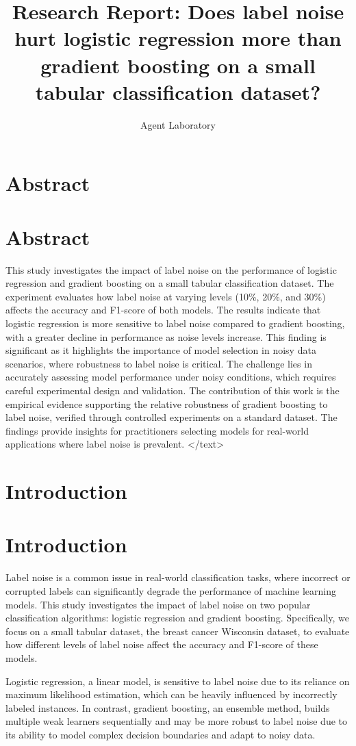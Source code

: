 \documentclass{article}
\title{Research Report: Does label noise hurt logistic regression more than gradient boosting on a small tabular classification dataset?}
\author{Agent Laboratory}
\begin{document}
\maketitle
\section{Abstract}
\section*{Abstract}
This study investigates the impact of label noise on the performance of logistic regression and gradient boosting on a small tabular classification dataset. The experiment evaluates how label noise at varying levels (10\%, 20\%, and 30\%) affects the accuracy and F1-score of both models. The results indicate that logistic regression is more sensitive to label noise compared to gradient boosting, with a greater decline in performance as noise levels increase. This finding is significant as it highlights the importance of model selection in noisy data scenarios, where robustness to label noise is critical. The challenge lies in accurately assessing model performance under noisy conditions, which requires careful experimental design and validation. The contribution of this work is the empirical evidence supporting the relative robustness of gradient boosting to label noise, verified through controlled experiments on a standard dataset. The findings provide insights for practitioners selecting models for real-world applications where label noise is prevalent.
</text>
\section{Introduction}
\section{Introduction}

Label noise is a common issue in real-world classification tasks, where incorrect or corrupted labels can significantly degrade the performance of machine learning models. This study investigates the impact of label noise on two popular classification algorithms: logistic regression and gradient boosting. Specifically, we focus on a small tabular dataset, the breast cancer Wisconsin dataset, to evaluate how different levels of label noise affect the accuracy and F1-score of these models. 

Logistic regression, a linear model, is sensitive to label noise due to its reliance on maximum likelihood estimation, which can be heavily influenced by incorrectly labeled instances. In contrast, gradient boosting, an ensemble method, builds multiple weak learners sequentially and may be more robust to label noise due to its ability to model complex decision boundaries and adapt to noisy data. 
\end{document}
